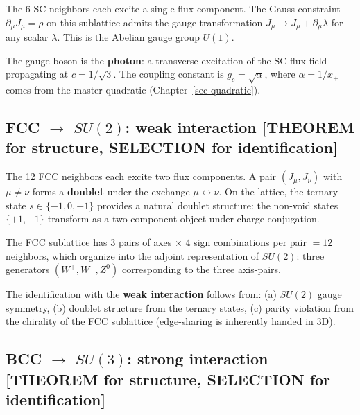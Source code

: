 \documentclass[
  11pt,
  letterpaper,
  twoside,
  openany]{book}
\makeatletter
\let\orig@subsection\subsection
\renewcommand{\subsection}{\needspace{6\baselineskip}\orig@subsection}
\makeatother
\begin{document}
The 6 SC neighbors each excite a single flux component. The Gauss
constraint \(\partial_\mu J_\mu = \rho\) on this sublattice admits the
gauge transformation \(J_\mu \to J_\mu + \partial_\mu \lambda\) for any
scalar \(\lambda\). This is the Abelian gauge group \(U(1)\).

The gauge boson is the \textbf{photon}: a transverse excitation of the
SC flux field propagating at \(c = 1/\sqrt{3}\). The coupling constant
is \(g_c = \sqrt{\alpha}\), where \(\alpha = 1/x_+\) comes from the
master quadratic (Chapter~\ref{sec-quadratic}).

\subsection{\texorpdfstring{FCC \(\to\) \(SU(2)\): weak interaction
{[}THEOREM for structure, SELECTION for
identification{]}}{FCC \textbackslash to SU(2): weak interaction {[}THEOREM for structure, SELECTION for identification{]}}}\label{fcc-to-su2-weak-interaction-theorem-for-structure-selection-for-identification}

The 12 FCC neighbors each excite two flux components. A pair
\((J_\mu, J_\nu)\) with \(\mu \neq \nu\) forms a \textbf{doublet} under
the exchange \(\mu \leftrightarrow \nu\). On the lattice, the ternary
state \(s \in \{-1, 0, +1\}\) provides a natural doublet structure: the
non-void states \(\{+1, -1\}\) transform as a two-component object under
charge conjugation.

The FCC sublattice has 3 pairs of axes \(\times\) 4 sign combinations
per pair \(= 12\) neighbors, which organize into the adjoint
representation of \(SU(2)\): three generators \((W^+, W^-, Z^0)\)
corresponding to the three axis-pairs.

The identification with the \textbf{weak interaction} follows from: (a)
\(SU(2)\) gauge symmetry, (b) doublet structure from the ternary states,
(c) parity violation from the chirality of the FCC sublattice
(edge-sharing is inherently handed in 3D).

\subsection{\texorpdfstring{BCC \(\to\) \(SU(3)\): strong interaction
{[}THEOREM for structure, SELECTION for
identification{]}}{BCC \textbackslash to SU(3): strong interaction {[}THEOREM for structure, SELECTION for identification{]}}}\label{bcc-to-su3-strong-interaction-theorem-for-structure-selection-for-identification}
\end{document}
